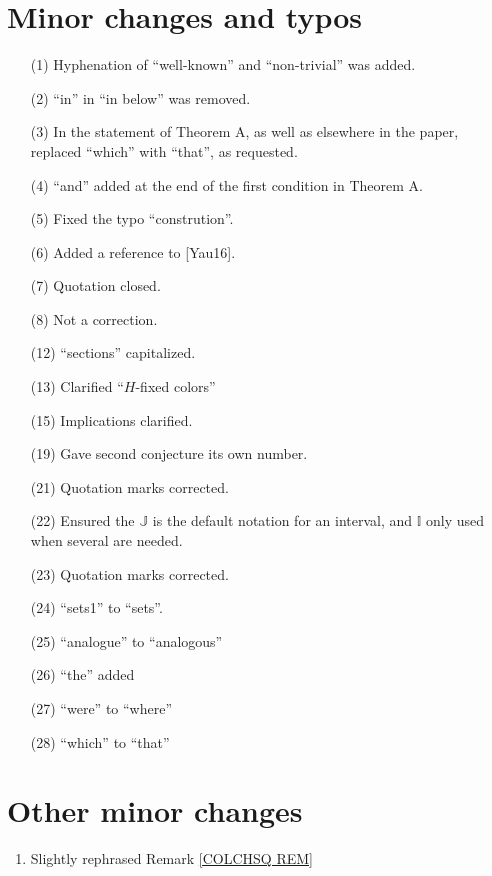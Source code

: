\documentclass[a4paper,10pt
]{article}%
\numberwithin{equation}{section}
\numberwithin{figure}{section}
\theoremstyle{definition} %
\newcommand{\1}{\ensuremath{\mathbbm 1}}%
\begin{document}
\section{Minor changes and typos}
 

\begin{enumerate}
\item[(1)] Hyphenation of ``well-known'' and ``non-trivial'' was added.
\item[(2)] ``in'' in ``in below'' was removed.
\item[(3)] In the statement of Theorem A, as well as elsewhere in the paper, replaced ``which'' with ``that'', as requested.
\item[(4)] ``and'' added at the end of the first condition in Theorem A.
\item[(5)] Fixed the typo ``constrution''. 
\item[(6)] Added a reference to [Yau16].
\item[(7)] Quotation closed.
\item[(8)] Not a correction.
\item[(12)] ``sections'' capitalized.
\item[(13)] Clarified ``$H$-fixed colors''
\item[(15)] Implications clarified.
\item[(19)] Gave second conjecture its own number.
\item[(21)] Quotation marks corrected.
\item[(22)] Ensured the $\mathbb{J}$ is the default notation for an interval, and $\mathbb{I}$ only used when several are needed.
\item[(23)] Quotation marks corrected.
\item[(24)] ``sets1'' to ``sets''.
\item[(25)] ``analogue'' to ``analogous''
\item[(26)] ``the'' added
\item[(27)] ``were'' to ``where''
\item[(28)] ``which'' to ``that''
\end{enumerate}

\section{Other minor changes}

\begin{enumerate}
\item Slightly rephrased Remark \ref{COLCHSQ REM}
\end{enumerate}





% 
\end{document}
